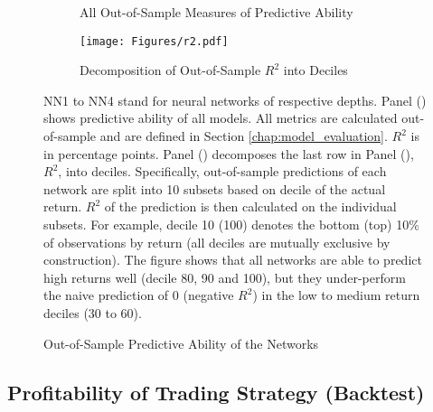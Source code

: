 		\begin{figure}	
			\centering		
			\begin{subfigure}[t]{\textwidth}
				\centering	
				
				\caption{All Out-of-Sample Measures of Predictive Ability}
				\label{tab:performance}
			\end{subfigure}
			
			\begin{subfigure}[t]{\textwidth}
				\texttt{[image: Figures/r2.pdf]}
				\caption{Decomposition of Out-of-Sample $R^2$ into Deciles}
				\label{fig:r2}
			\end{subfigure}
			\caption{Out-of-Sample Predictive Ability of the Networks}
			\medskip
			\small
			NN1 to NN4 stand for neural networks of respective depths. Panel () shows predictive ability of all models. All metrics are calculated out-of-sample and are defined in Section \ref{chap:model_evaluation}. $R^2$ is in percentage points. Panel () decomposes the last row in Panel (), $R^2$, into deciles. Specifically, out-of-sample predictions of each network are split into 10 subsets based on decile of the actual return. $R^2$ of the prediction is then calculated on the individual subsets. For example, decile 10 (100) denotes the bottom (top) 10\% of observations by return (all deciles are mutually exclusive by construction). The figure shows that all networks are able to predict high returns well (decile 80, 90 and 100), but they under-perform the naive prediction of 0 (negative $R^2$) in the low to medium return deciles (30 to 60). 
			\label{fig:predictive_ability}
		\end{figure}     
		

	\subsection{Profitability of Trading Strategy (Backtest)}
		\label{chap:backtest}
		
